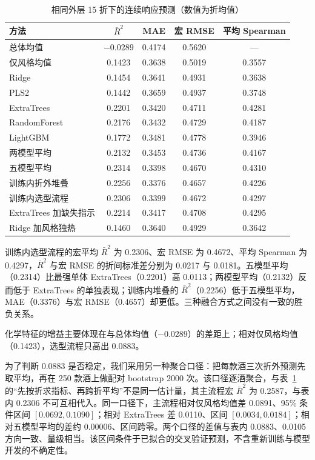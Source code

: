 \documentclass[UTF8,a4paper,zihao=-4]{ctexart}
\numberwithin{figure}{section}
\numberwithin{table}{section}
\numberwithin{equation}{section}
\begin{document}
\begin{table}[H]
  \centering
  \caption{相同外层 15 折下的连续响应预测（数值为折均值）}
  \label{tab:q1-results}
  \small
  \begin{tabularx}{\textwidth}{@{}>{\raggedright\arraybackslash}X c c c c@{}}
    \toprule
    方法 & $\bar R^{2}$ & MAE & 宏 RMSE & 平均 Spearman \\
    \midrule
    总体均值 & $-0.0289$ & 0.4174 & 0.5620 & — \\
    仅风格均值 & 0.1423 & 0.3638 & 0.5019 & 0.3557 \\
    Ridge & 0.1454 & 0.3641 & 0.4931 & 0.3638 \\
    PLS2 & 0.1442 & 0.3659 & 0.4937 & 0.3748 \\
    ExtraTrees & 0.2201 & 0.3420 & 0.4711 & 0.4281 \\
    RandomForest & 0.2176 & 0.3432 & 0.4729 & 0.4187 \\
    LightGBM & 0.1772 & 0.3481 & 0.4778 & 0.3946 \\
    两模型平均 & 0.2132 & 0.3453 & 0.4736 & 0.4167 \\
    五模型平均 & 0.2314 & 0.3398 & 0.4670 & 0.4310 \\
    训练内折外堆叠 & 0.2256 & 0.3376 & 0.4657 & 0.4226 \\
    训练内选型流程 & 0.2306 & 0.3399 & 0.4672 & 0.4297 \\
    ExtraTrees 加缺失指示 & 0.2214 & 0.3417 & 0.4708 & 0.4295 \\
    Ridge 加风格独热 & 0.1460 & 0.3640 & 0.4929 & 0.3642 \\
    \bottomrule
  \end{tabularx}
\end{table}

训练内选型流程的宏平均 $\bar R^2$ 为 0.2306、宏 RMSE 为 0.4672、平均 Spearman 为 0.4297，$\bar R^2$ 与宏 RMSE 的折间标准差分别为 0.0217 与 0.0181。五模型平均（0.2314）比最强单体 ExtraTrees（0.2201）高 0.0113；两模型平均（0.2132）反而低于 ExtraTrees 的单独表现；训练内堆叠的 $\bar R^2$（0.2256）低于五模型平均，MAE（0.3376）与宏 RMSE（0.4657）却更低。三种融合方式之间没有一致的胜负关系。

化学特征的增益主要体现在与总体均值（$-0.0289$）的差距上；相对仅风格均值（0.1423），选型流程只高出 0.0883。

为了判断 0.0883 是否稳定，我们采用另一种聚合口径：把每款酒三次折外预测先取平均，再在 250 款酒上做配对 bootstrap 2000 次。该口径逐酒聚合，与表~\ref{tab:q1-results} 的“先按折求指标、再跨折平均”不是同一估计量，其主流程宏 $\bar R^2$ 为 0.2587，与表内 0.2306 不可互相代入。同一口径下，主流程相对仅风格均值差 0.0891、95\% 条件区间 $[0.0692,0.1090]$；相对 ExtraTrees 差 0.0110、区间 $[0.0034,0.0184]$；相对五模型平均的差约 0.00006、区间跨零。两个口径的差值与表内 0.0883、0.0105 方向一致、量级相当。该区间条件于已拟合的交叉验证预测，不含重新训练与模型开发的不确定性。
\end{document}
